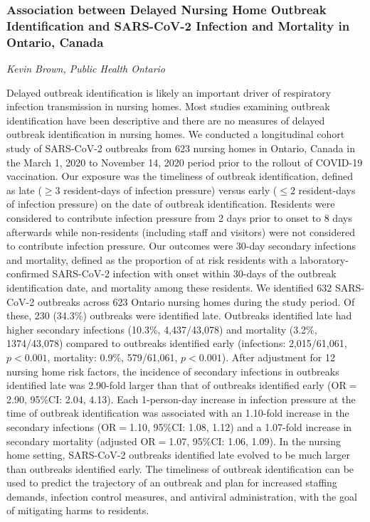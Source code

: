 \subsubsection*{Association between Delayed Nursing Home Outbreak Identification and
SARS-CoV-2 Infection and Mortality in Ontario, Canada}
\textit{Kevin Brown, Public Health Ontario}

Delayed outbreak identification is likely an important driver of respiratory
infection transmission in nursing homes. Most studies examining outbreak
identification have been descriptive and there are no measures of delayed
outbreak identification in nursing homes. We conducted a longitudinal cohort
study of SARS-CoV-2 outbreaks from 623 nursing homes in Ontario, Canada in the
March 1, 2020 to November 14, 2020 period prior to the rollout of COVID-19
vaccination. Our exposure was the timeliness of outbreak identification, defined
as late ($\ge3$ resident-days of infection pressure) versus early
($\le2$ resident-days of infection pressure) on the date of outbreak
identification. Residents were considered to contribute infection pressure from
2 days prior to onset to 8 days afterwards while non-residents (including staff
and visitors) were not considered to contribute infection pressure. Our outcomes
were 30-day secondary infections and mortality, defined as the proportion of at
risk residents with a laboratory-confirmed SARS-CoV-2 infection with onset
within 30-days of the outbreak identification date, and mortality among these
residents. We identified 632 SARS-CoV-2 outbreaks across 623 Ontario nursing
homes during the study period. Of these, 230 (34.3\%) outbreaks were identified
late. Outbreaks identified late had higher secondary
infections (10.3\%, 4,437/43,078) and mortality (3.2\%, 1374/43,078) compared to
outbreaks identified early (infections: 2,015/61,061, $p<0.001$, mortality: 0.9\%,
579/61,061, $p<0.001$). After adjustment for 12 nursing home risk factors, the
incidence of secondary infections in outbreaks identified late was 2.90-fold
larger than that of outbreaks identified early (OR$=$2.90, 95\%CI: 2.04, 4.13).
Each 1-person-day increase in infection pressure at the time of outbreak
identification was associated with an 1.10-fold increase in the secondary
infections (OR$=$1.10, 95\%CI: 1.08, 1.12) and a 1.07-fold increase in secondary
mortality (adjusted OR$=$1.07, 95\%CI: 1.06, 1.09). In the nursing home setting,
SARS-CoV-2 outbreaks identified late evolved to be much larger than outbreaks
identified early. The timeliness of outbreak identification can be used to
predict the trajectory of an outbreak and plan for increased staffing demands,
infection control measures, and antiviral administration, with the goal of
mitigating harms to residents.
